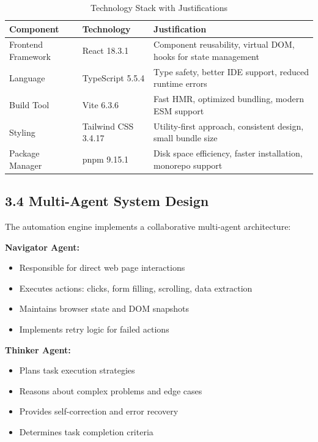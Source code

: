 \documentclass[12pt,a4paper]{article}
\begin{document}
\begin{table}[h]
\centering
\begin{tabular}{|l|l|p{6cm}|}
\hline
\textbf{Component} & \textbf{Technology} & \textbf{Justification} \\
\hline
Frontend Framework & React 18.3.1 & Component reusability, virtual DOM, hooks for state management \\
\hline
Language & TypeScript 5.5.4 & Type safety, better IDE support, reduced runtime errors \\
\hline
Build Tool & Vite 6.3.6 & Fast HMR, optimized bundling, modern ESM support \\
\hline
Styling & Tailwind CSS 3.4.17 & Utility-first approach, consistent design, small bundle size \\
\hline
Package Manager & pnpm 9.15.1 & Disk space efficiency, faster installation, monorepo support \\
\hline
\end{tabular}
\caption{Technology Stack with Justifications}
\end{table}
\newpage

\subsection*{\textbf{3.4 Multi-Agent System Design}}

The automation engine implements a collaborative multi-agent architecture:

\vspace{0.3cm}

\textbf{Navigator Agent:}
\begin{itemize}
    \item Responsible for direct web page interactions
    \item Executes actions: clicks, form filling, scrolling, data extraction
    \item Maintains browser state and DOM snapshots
    \item Implements retry logic for failed actions
\end{itemize}

\vspace{0.3cm}

\textbf{Thinker Agent:}
\begin{itemize}
    \item Plans task execution strategies
    \item Reasons about complex problems and edge cases
    \item Provides self-correction and error recovery
    \item Determines task completion criteria
\end{itemize}
\end{document}
